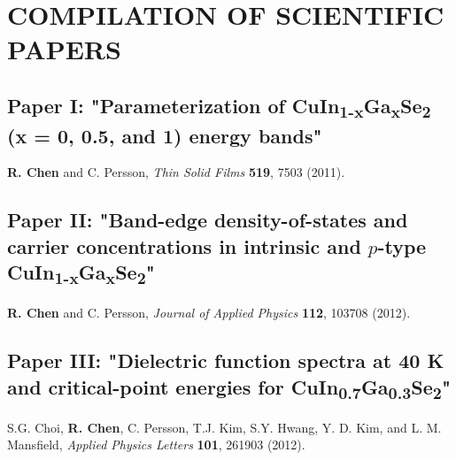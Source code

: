 \documentclass[a4paper, 12pt, titlepage,oneside,drop]{kthesis}
\begin{document}
\chapter{COMPILATION OF SCIENTIFIC PAPERS}

\section{Paper I: "Parameterization of CuIn\textsubscript{1-x}Ga\textsubscript{x}Se\textsubscript{2} (x = 0, 0.5, and 1) energy bands"}
\textbf{R. Chen} and C. Persson, \textit{Thin Solid Films} {\textbf {519}}, 7503 (2011).



\newpage




\section{Paper II: "Band-edge density-of-states and carrier concentrations in intrinsic and $p$-type CuIn\textsubscript{1-x}Ga\textsubscript{x}Se\textsubscript{2}"}
\textbf{R. Chen} and C. Persson, \textit{Journal of Applied Physics} {\textbf {112}}, 103708 (2012).



\newpage



\section{Paper III: "Dielectric function spectra at 40 K and critical-point energies for CuIn\textsubscript{0.7}Ga\textsubscript{0.3}Se\textsubscript{2}"}
S.G. Choi, \textbf{R. Chen}, C. Persson, T.J. Kim, S.Y. Hwang, Y. D. Kim, and L. M. Mansfield,
\textit{Applied Physics Letters} {\textbf {101}}, 261903 (2012).



\newpage


\end{document}
